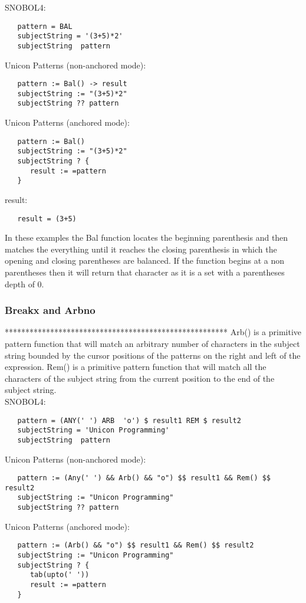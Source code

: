 \documentclass{article}
\begin{document}
\noindent
SNOBOL4:
\begin{verbatim}
   pattern = BAL
   subjectString = '(3+5)*2'
   subjectString  pattern
\end{verbatim}

\noindent
Unicon Patterns (non-anchored mode):
\begin{verbatim}
   pattern := Bal() -> result
   subjectString := "(3+5)*2"
   subjectString ?? pattern
\end{verbatim}
\noindent
Unicon Patterns (anchored mode):
\begin{verbatim}
   pattern := Bal()
   subjectString := "(3+5)*2"
   subjectString ? {
      result := =pattern
   }
\end{verbatim}

\noindent
result:
\begin{verbatim}
   result = (3+5)
\end{verbatim}
In these examples the Bal function locates the beginning parenthesis and then matches the everything until it reaches the closing parenthesis in which the opening and closing parentheses are balanced.  If the function begins at a non parentheses then it will return that character as it is a set with a parentheses depth of 0.

\vspace{2 pc}
\subsubsection{Breakx and Arbno}
******************************************************
Arb() is a primitive pattern function that will match an arbitrary number of characters in the subject string bounded by the cursor positions of the patterns on the right and left of the expression.  Rem() is a primitive pattern function that will match all the characters of the subject string from the current position to the end of the subject string.\\

\noindent
SNOBOL4:
\begin{verbatim}
   pattern = (ANY(' ') ARB  'o') $ result1 REM $ result2
   subjectString = 'Unicon Programming'
   subjectString  pattern
\end{verbatim}

\noindent
Unicon Patterns (non-anchored mode):
\begin{verbatim}
   pattern := (Any(' ') && Arb() && "o") $$ result1 && Rem() $$ result2
   subjectString := "Unicon Programming"
   subjectString ?? pattern
\end{verbatim}
\noindent
Unicon Patterns (anchored mode):
\begin{verbatim}
   pattern := (Arb() && "o") $$ result1 && Rem() $$ result2
   subjectString := "Unicon Programming"
   subjectString ? {
      tab(upto(' '))
      result := =pattern
   }
\end{verbatim}
\end{document}
